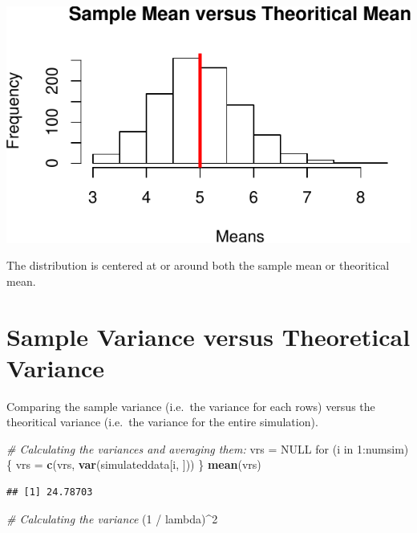 \documentclass[]{article}
\newenvironment{Shaded}{\begin{snugshade}}{\end{snugshade}}
\newcommand{\KeywordTok}[1]{\textcolor[rgb]{0.13,0.29,0.53}{\textbf{{#1}}}}
\newcommand{\DecValTok}[1]{\textcolor[rgb]{0.00,0.00,0.81}{{#1}}}
\newcommand{\StringTok}[1]{\textcolor[rgb]{0.31,0.60,0.02}{{#1}}}
\newcommand{\CommentTok}[1]{\textcolor[rgb]{0.56,0.35,0.01}{\textit{{#1}}}}
\newcommand{\OtherTok}[1]{\textcolor[rgb]{0.56,0.35,0.01}{{#1}}}
\newcommand{\NormalTok}[1]{{#1}}
\begin{document}
\includegraphics{statinference-courseproject-1-Question-1_files/figure-latex/unnamed-chunk-4-1.pdf}

The distribution is centered at or around both the sample mean or
theoritical mean.

\section{Sample Variance versus Theoretical
Variance}\label{sample-variance-versus-theoretical-variance}

Comparing the sample variance (i.e.~the variance for each rows) versus
the theoritical variance (i.e.~the variance for the entire simulation).

\begin{Shaded}
\begin{Highlighting}[]
\CommentTok{# Calculating the variances and averaging them:}
\NormalTok{vrs =}\StringTok{ }\OtherTok{NULL}
\NormalTok{for (i in }\DecValTok{1}\NormalTok{:numsim) \{}
  \NormalTok{vrs =}\StringTok{ }\KeywordTok{c}\NormalTok{(vrs, }\KeywordTok{var}\NormalTok{(simulateddata[i, ]))}
\NormalTok{\}}
\KeywordTok{mean}\NormalTok{(vrs)}
\end{Highlighting}
\end{Shaded}

\begin{verbatim}
## [1] 24.78703
\end{verbatim}

\begin{Shaded}
\begin{Highlighting}[]
\CommentTok{# Calculating the variance}
\NormalTok{(}\DecValTok{1} \NormalTok{/}\StringTok{ }\NormalTok{lambda)^}\DecValTok{2}
\end{Highlighting}
\end{Shaded}
\end{document}

